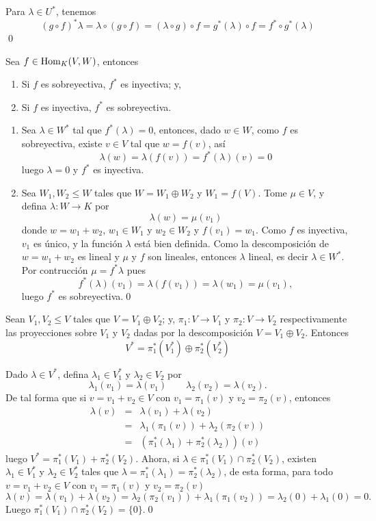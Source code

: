 \dem Para $\lambda\in U^*$, tenemos
\[
(g\circ f)^*\lambda=\lambda\circ (g\circ f)=(\lambda\circ g)\circ f=g^*(\lambda)\circ f=f^*\circ g^* (\lambda)
\]
\qed

\begin{pro}
Sea $f\in\operatorname{Hom}_K(V,W)$, entonces
\begin{enumerate}
\item Si $f$ es sobreyectiva, $f^*$ es inyectiva; y,
\item Si $f$ es inyectiva, $f^*$ es sobreyectiva. 
\end{enumerate}
\end{pro}

\dem
\begin{enumerate}
\item Sea $\lambda\in W^*$ tal que $f^*(\lambda)=0$, entonces, dado $w\in W$, como $f$ es sobreyectiva, existe $v\in V$ tal que $w=f(v)$, as\'i
\[
\lambda(w)=\lambda\left(f(v)\right)=f^*(\lambda)(v)=0
\]
luego $\lambda=0$ y $f^*$ es inyectiva.
\item Sea $W_1,W_2\le W$ tales que $W=W_1\oplus W_2$ y $W_1=f(V)$. Tome $\mu\in V$, y  defina $\lambda: W \rightarrow K$ por
\[
\lambda(w)=\mu(v_1)
\]
donde $w=w_1+w_2$, $w_1\in W_1$ y $w_2\in W_2$ y $f(v_1)=w_1$. Como $f$ es inyectiva, $v_1$ es \'unico, y la funci\'on $\lambda$ est\'a bien definida. Como la descomposici\'on de $w=w_1+w_2$ es lineal y $\mu$ y $f$ son lineales, entonces $\lambda$ lineal, es decir $\lambda\in W^*$. Por contrucci\'on $\mu=f^*\lambda$ pues
\[
f^*(\lambda)(v_1)=\lambda(f(v_1))=\lambda(w_1)=\mu(v_1),
\]
luego $f^*$ es sobreyectiva.\qed
\end{enumerate}

\begin{pro}
Sean $V_1,V_2\le V$ tales que $V=V_1\oplus V_2$; y, $\pi_1:V\rightarrow  V_1$ y $\pi_2:V\rightarrow V_2$ respectivamente las proyecciones sobre $V_1$ y $V_2$ dadas por la descomposici\'on $V=V_1\oplus V_2$. Entonces
\[
V^*=\pi_1^*(V^*_1)\oplus\pi_2^*(V^*_2)
\]
\end{pro}

\dem Dado $\lambda\in V^*$, defina $\lambda_1\in V_1^*$ y $\lambda_2\in V_2$ por
\[
\lambda_1(v_1)=\lambda(v_1)\qquad\lambda_2(v_2)=\lambda(v_2).
\]
De tal forma que si $v=v_1+v_2\in V$ con $v_1=\pi_1(v)$ y $v_2=\pi_2(v)$, entonces
\begin{eqnarray*}
\lambda(v) & = & \lambda(v_1)+\lambda(v_2)\\
 & = & \lambda_1\left(\pi_1(v)\right)+\lambda_2\left(\pi_2(v)\right)\\
 & = & \left(\pi_1^*(\lambda_1)+\pi_2^*(\lambda_2)\right)(v)
\end{eqnarray*}  
luego $V^*=\pi_1^*(V_1)+\pi_2^*(V_2)$. Ahora, si $\lambda\in \pi_1^*(V_1)\cap\pi_2^*(V_2)$, existen $\lambda_1\in V_1^*$ y $\lambda_2\in V_2^*$ tales que $\lambda=\pi_1^*(\lambda_1)=\pi_2^*(\lambda_2)$, de esta forma, para todo $v=v_1+v_2\in V$ con $v_1=\pi_1(v)$ y $v_2=\pi_2(v)$
\[
\lambda(v)=\lambda(v_1)+\lambda(v_2)=\lambda_2\left(\pi_2(v_1)\right)+\lambda_1\left(\pi_1(v_2)\right)=\lambda_2(0)+\lambda_1(0)=0.
\]
Luego $\pi_1^*(V_1)\cap\pi_2^*(V_2)=\{0\}$.\qed

